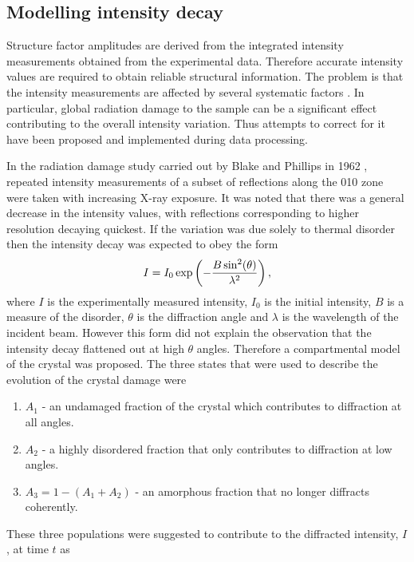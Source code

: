     \subsection{Modelling intensity decay}
    \label{sub:Modelling intensity decay}
        Structure factor amplitudes are derived from the integrated intensity measurements obtained from the experimental data.
        Therefore accurate intensity values are required to obtain reliable structural information.
		The problem is that the intensity measurements are affected by several systematic factors \cite{evans2005}.
		In particular, global radiation damage to the sample can be a significant effect contributing to the overall intensity variation.
		Thus attempts to correct for it have been proposed and implemented during data processing.

        In the radiation damage study carried out by Blake and Phillips in 1962 \cite{blake1962}, repeated intensity measurements of a subset of reflections along the 010 zone were taken with increasing X-ray exposure.
        It was noted that there was a general decrease in the intensity values, with reflections corresponding to higher resolution decaying quickest.
        If the variation was due solely to thermal disorder then the intensity decay was expected to obey the form
        \begin{equation}
            I = I_0 \exp\left(-\frac{B \sin^2(\theta)}{\lambda^2} \right),
        \end{equation}
        where $I$ is the experimentally measured intensity, $I_0$ is the initial intensity, $B$ is a measure of the disorder, $\theta$ is the diffraction angle and $\lambda$ is the wavelength of the incident beam.
        However this form did not explain the observation that the intensity decay flattened out at high $\theta$ angles.
        Therefore a compartmental model of the crystal was proposed. The three states that were used to describe the evolution of the crystal damage were
        \begin{enumerate}
            \item $A_1$ - an undamaged fraction of the crystal which contributes to diffraction at all angles.
            \item $A_2$ - a highly disordered fraction that only contributes to diffraction at low angles.
            \item $A_3 = 1 - (A_1 + A_2)$ - an amorphous fraction that no longer diffracts coherently.
        \end{enumerate}
        These three populations were suggested to contribute to the diffracted intensity, $I$, at time $t$ as

